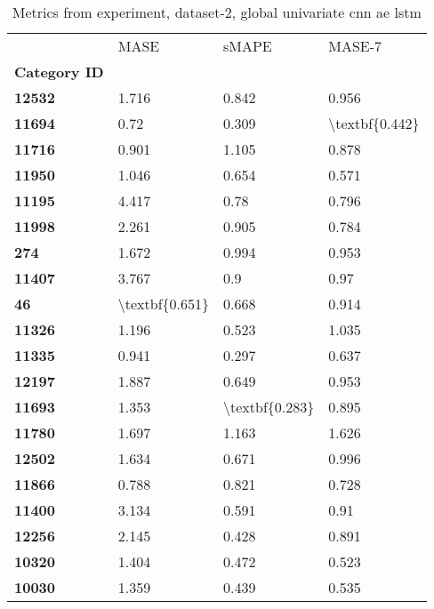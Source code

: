 \begin{table}[h]
\centering
\caption{Metrics from experiment, dataset-2, global univariate cnn ae lstm}
\label{table:global-univariate-cnn-ae-lstm-dataset-2}
\begin{tabular}{llll}
\toprule
{} &            MASE &           sMAPE &          MASE-7 \\
\textbf{Category ID} &                 &                 &                 \\
\midrule
\textbf{12532      } &           1.716 &           0.842 &           0.956 \\
\textbf{11694      } &            0.72 &           0.309 &  \textbackslash textbf\{0.442\} \\
\textbf{11716      } &           0.901 &           1.105 &           0.878 \\
\textbf{11950      } &           1.046 &           0.654 &           0.571 \\
\textbf{11195      } &           4.417 &            0.78 &           0.796 \\
\textbf{11998      } &           2.261 &           0.905 &           0.784 \\
\textbf{274        } &           1.672 &           0.994 &           0.953 \\
\textbf{11407      } &           3.767 &             0.9 &            0.97 \\
\textbf{46         } &  \textbackslash textbf\{0.651\} &           0.668 &           0.914 \\
\textbf{11326      } &           1.196 &           0.523 &           1.035 \\
\textbf{11335      } &           0.941 &           0.297 &           0.637 \\
\textbf{12197      } &           1.887 &           0.649 &           0.953 \\
\textbf{11693      } &           1.353 &  \textbackslash textbf\{0.283\} &           0.895 \\
\textbf{11780      } &           1.697 &           1.163 &           1.626 \\
\textbf{12502      } &           1.634 &           0.671 &           0.996 \\
\textbf{11866      } &           0.788 &           0.821 &           0.728 \\
\textbf{11400      } &           3.134 &           0.591 &            0.91 \\
\textbf{12256      } &           2.145 &           0.428 &           0.891 \\
\textbf{10320      } &           1.404 &           0.472 &           0.523 \\
\textbf{10030      } &           1.359 &           0.439 &           0.535 \\
\bottomrule
\end{tabular}
\end{table}
